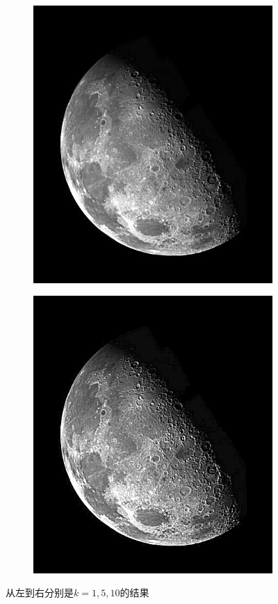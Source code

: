 \documentclass{article}
\begin{document}
\begin{figure}[htbp]
\begin{subfigure}{.32\textwidth}
        \includegraphics[width=\linewidth]{img/usm/5.png}
    \end{subfigure}
    \begin{subfigure}{.32\textwidth}
        \includegraphics[width=\linewidth]{img/usm/10.png}
    \end{subfigure}
    \caption{从左到右分别是$k=1, 5, 10$的结果}
\end{figure}
\end{document}
